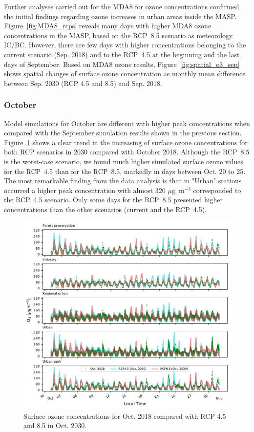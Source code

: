 Further analyses carried out for the MDA8 for ozone concentrations confirmed the initial findings regarding ozone increases in urban areas inside the MASP.
Figure~\ref{fig:MDA8_rcps} reveals many days with higher MDA8 ozone concentrations in the MASP, based on the RCP~8.5 scenario as meteorology IC/BC.
However, there are few days with higher concentrations belonging to the current scenario (Sep. 2018) and to the RCP~4.5 at the beginning and the last days of September.
Based on MDA8 ozone results, Figure~\ref{fig:spatial_o3_sep} shows spatial changes of surface ozone concentration as monthly mean difference between Sep. 2030 (RCP 4.5 and 8.5) and Sep. 2018.

\subsubsection{October}
Model simulations for October are different with higher peak concentrations when compared with the September simulation results shown in the previous section.
Figure~\ref{fig:o3_rcp_oct} shows a clear trend in the increasing of surface ozone concentrations for both RCP scenarios in 2030 compared with October 2018.
Although the RCP~8.5 is the worst-case scenario, we found much higher simulated surface ozone values for the RCP~4.5 than for the RCP~8.5, markedly in days between Oct. 20 to 25.
The most remarkable finding from the data analysis is that in "Urban" stations occurred a higher peak concentration with almost 320 $\mu$g~m$^{-3}$ corresponded to the RCP~4.5 scenario.
Only some days for the RCP~8.5 presented higher concentrations than the other scenarios (current and the RCP~4.5).

\begin{figure}[!hbt]
  \includegraphics[width=1\textwidth]{fig/rcp_2030_oct_subplot_o3}
  \caption{Surface ozone concentrations for Oct. 2018 compared with RCP 4.5 and 8.5 in Oct. 2030.}
  \label{fig:o3_rcp_oct}
\end{figure}

